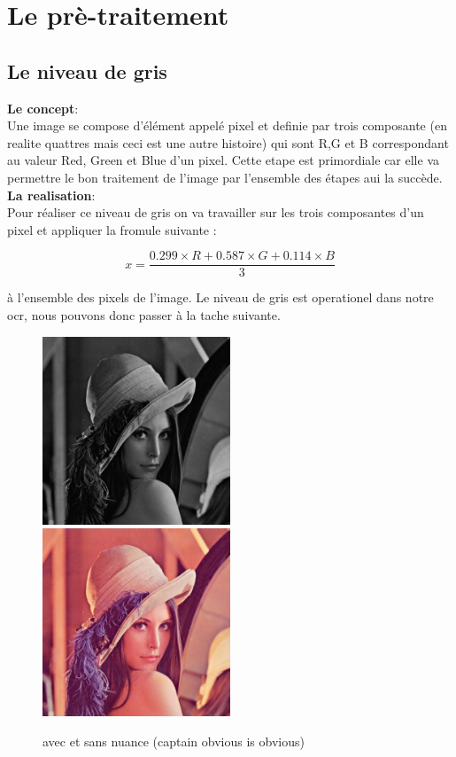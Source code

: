 \section{Le prè-traitement}
\subsection{Le niveau de gris}
\textbf{Le concept}:\\
Une image se compose d'élément appelé pixel et definie par trois composante (en realite quattres mais ceci est une autre histoire) qui sont R,G et B correspondant au valeur Red, Green et Blue d'un pixel. Cette etape est primordiale car elle va permettre le bon traitement de l'image par l'ensemble des étapes aui la succède.\\
\textbf{La realisation}:\\
Pour réaliser ce niveau de gris on va travailler sur les trois composantes d'un pixel et appliquer la fromule suivante :
\\
\begin{center}
	\[x = \frac{0.299 \times R + 0.587 \times G + 0.114 \times B}{3}\]
\end{center}
à l'ensemble des pixels de l'image. Le niveau de gris est operationel dans notre ocr, nous pouvons donc passer à la tache suivante.
\begin{figure}[h]
	\includegraphics[width=0.50\textwidth]{grey.png}
	\includegraphics[width=0.50\textwidth]{lena.jpg}
	\caption{avec et sans nuance (captain obvious is obvious)}
\end{figure}
\newpage
